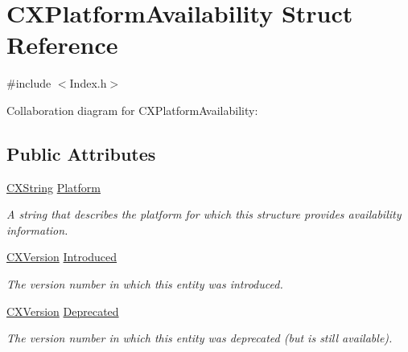 \hypertarget{structCXPlatformAvailability}{}\section{C\+X\+Platform\+Availability Struct Reference}
\label{structCXPlatformAvailability}


{\ttfamily \#include $<$Index.\+h$>$}



Collaboration diagram for C\+X\+Platform\+Availability\+:
\subsection*{Public Attributes}
\begin{DoxyCompactItemize}
\item 
\hyperlink{structCXString}{C\+X\+String} \hyperlink{structCXPlatformAvailability_a4ae9c3ed26d1701f0cd42d6743f3e901}{Platform}
\begin{DoxyCompactList}\small\item\em A string that describes the platform for which this structure provides availability information. \end{DoxyCompactList}\item 
\mbox{\label{structCXPlatformAvailability_ac3dcb0445f895215db556beadd6d0c91}} 
\hyperlink{structCXVersion}{C\+X\+Version} \hyperlink{structCXPlatformAvailability_ac3dcb0445f895215db556beadd6d0c91}{Introduced}
\begin{DoxyCompactList}\small\item\em The version number in which this entity was introduced. \end{DoxyCompactList}\item 
\mbox{\label{structCXPlatformAvailability_ab97c416a610961bbe0e3f316bc726b09}} 
\hyperlink{structCXVersion}{C\+X\+Version} \hyperlink{structCXPlatformAvailability_ab97c416a610961bbe0e3f316bc726b09}{Deprecated}
\begin{DoxyCompactList}\small\item\em The version number in which this entity was deprecated (but is still available). \end{DoxyCompactList}\item 
\mbox{\label{structCXPlatformAvailability_a55e178964401575e70088e6ff20ed5da}} 

\end{DoxyCompactItemize}
